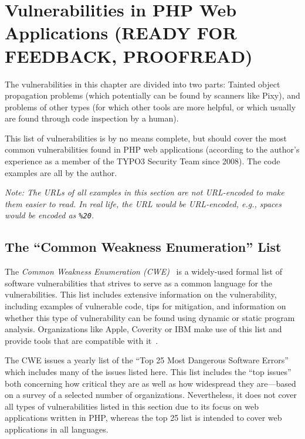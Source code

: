 \chapter{Vulnerabilities in PHP Web Applications (READY FOR FEEDBACK, PROOFREAD)}
\label{vulnerabilities}

The vulnerabilities in this chapter are divided into two parts: Tainted object propagation problems (which potentially can be found by scanners like Pixy), and problems of other types (for which other tools are more helpful, or which usually are found through code inspection by a human).

This list of vulnerabilities is by no means complete, but should cover the most common vulnerabilities found in PHP web applications (according to the author's experience as a member of the TYPO3 Security Team since 2008). The code examples are all by the author.

\emph{Note: The URLs of all examples in this section are not URL-encoded to make them easier to read. In real life, the URL would be URL-encoded, e.g., spaces would be encoded as \texttt{\%20}.}

\section{The ``Common Weakness Enumeration'' List}
The \emph{Common Weakness Enumeration (CWE)}~\cite{cwe} is a widely-used formal list of software vulnerabilities that strives to serve as a common language for the vulnerabilities. This list includes extensive information on the vulnerability, including examples of vulnerable code, tips for mitigation, and information on whether this type of vulnerability can be found using dynamic or static program analysis. Organizations like Apple, Coverity or IBM make use of this list and provide tools that are compatible with it~\cite{cwe-organizations}.

The CWE issues a yearly list of the ``Top 25 Most Dangerous Software Errors''~\cite{cwe-top-25} which includes many of the issues listed here. This list includes the ``top issues'' both concerning how critical they are as well as how widespread they are---based on a survey of a selected number of organizations. Nevertheless, it does not cover all types of vulnerabilities listed in this section due to its focus on web applications written in PHP, whereas the top 25 list is intended to cover web applications in all languages.

